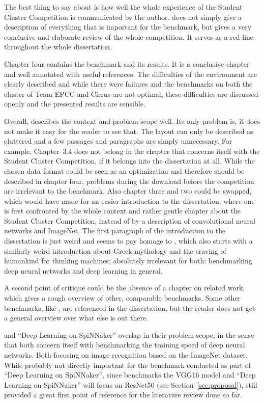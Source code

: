 \documentclass{article}
\begin{document}
The best thing to say about \citet{nita_2018} is how well
the whole experience of the Student Cluster Competition is
communicated by the author.
\citet{nita_2018} does not simply give a description of
everything that is important for the benchmark, but gives
a very conclusive and elaborate review of the whole
competition.
It serves as a red line throughout the whole dissertation.

Chapter four contains the benchmark and its results.
It is a conclusive chapter and well annotated with useful
references.
The difficulties of the environment are clearly described
and while there were failures and the benchmarks on both
the cluster of Team EPCC and Cirrus are not optimal, these
difficulties are discussed openly and the presented results
are sensible.

Overall, \citet{nita_2018} describes the context and
problem scope well.
Its only problem is, it does not make it easy for the
reader to see that.
The layout can only be described as cluttered and a few
passages and paragraphs are simply unnecessary.
For example, Chapter~3.4 does not belong in the chapter
that concerns itself with the Student Cluster Competition,
if it belongs into the dissertation at all.
While the chosen data format could be seen as an
optimization and therefore should be described in chapter
four, problems during the download before the competition
are irrelevant to the benchmark.
Also chapter three and two could be swapped, which would
have made for an easier introduction to the dissertation,
where one is first confronted by the whole context and
rather gentle chapter about the Student Cluster
Competition, instead of by a description of convolutional
neural networks and ImageNet.
The first paragraph of the introduction to the dissertation
is just weird and seems to pay homage to
\citet{goodfellow2016}, which also starts with a similarly
weird introduction about Greek mythology and the craving of
humankind for thinking machines; absolutely irrelevant for
both: benchmarking deep neural networks and deep learning
in general.

A second point of critique could be the absence of a
chapter on related work, which gives a rough overview of
other, comparable benchmarks.
Some other benchmarks, like \citet{you2017}, are referenced
in the dissertation, but the reader does not get a general
overview over what else is out there.

\citet{nita_2018} and ``Deep Learning on SpiNNaker''
overlap in their problem scope, in the sense that both
concern itself with benchmarking the training speed of
deep neural networks.
Both focusing on image recognition based on the ImageNet
dataset.
While probably not directly important for the benchmark
conducted as part of ``Deep Learning on SpiNNaker'',
since \citet{nita_2018} benchmarks the VGG16 model and
``Deep Learning on SpiNNaker'' will focus on ResNet50
(see Section~\ref{sec:proposal}),
\citet{nita_2018} still provided a great first point of
reference for the literature review done so far.



\end{document}
